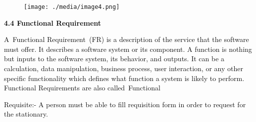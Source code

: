 \documentclass[12pt]{report}
\renewcommand{\_}{\kern-1.5pt\textunderscore\kern-1.5pt}
\begin{document}
\vspace{\baselineskip}



\begin{figure}[H]
	\begin{Center}
		\texttt{[image: ./media/image4.png]}
	\end{Center}
\end{figure}



\par


\vspace{\baselineskip}

\vspace{\baselineskip}
\begin{adjustwidth}{0.2in}{0.84in}
\begin{justify}
\textbf{\textcolor[HTML]{0D0D0D}{4.4 Functional Requirement}}
\end{justify}\par

\end{adjustwidth}


\vspace{\baselineskip}
\begin{adjustwidth}{0.2in}{0.84in}
\begin{justify}
\textcolor[HTML]{0D0D0D}{A Functional Requirement (FR) is a description of the service that the software must offer. It describes a software system or its component. A function is nothing but inputs to the software system, its behavior, and outputs. It can be a calculation, data manipulation, business process, user interaction, or any other specific functionality which defines what function a system is likely to perform. Functional Requirements are also called Functional}
\end{justify}\par

\end{adjustwidth}


\vspace{\baselineskip}
\begin{adjustwidth}{0.2in}{0.84in}
\begin{justify}
\textcolor[HTML]{0D0D0D}{Requisite:- A person must be able to fill requisition form in order to request for the stationary.}
\end{justify}\par

\end{adjustwidth}
\end{document}
